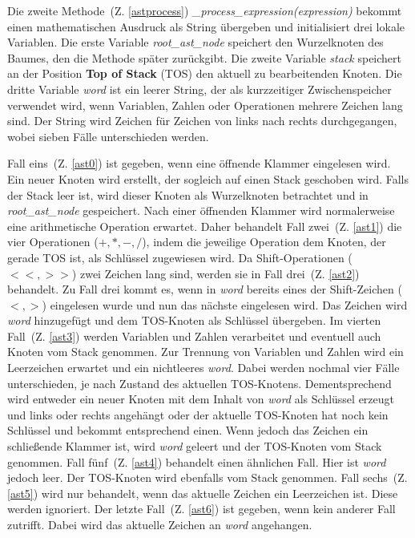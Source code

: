 Die zweite Methode~(Z. \ref{astprocess}) \textit{\_process\_expression(expression)} bekommt einen mathematischen Ausdruck als String übergeben und initialisiert drei lokale Variablen.
Die erste Variable \textit{root\_ast\_node} speichert den Wurzelknoten des Baumes, den die Methode später zurückgibt. Die zweite Variable \textit{stack} speichert an der 
Position \textbf{Top of Stack} (TOS) den aktuell zu bearbeitenden Knoten. Die dritte Variable \textit{word} ist ein leerer String, der als kurzzeitiger Zwischenspeicher verwendet wird,
wenn Variablen, Zahlen oder Operationen mehrere Zeichen lang sind.
Der String wird Zeichen für Zeichen von links nach rechts durchgegangen, wobei sieben Fälle unterschieden werden.

Fall eins~(Z. \ref{ast0}) ist gegeben, wenn eine öffnende Klammer eingelesen wird. Ein neuer Knoten wird erstellt, der sogleich auf einen Stack geschoben wird. Falls der Stack leer ist, wird
dieser Knoten als Wurzelknoten betrachtet und in \textit{root\_ast\_node} gespeichert.
Nach einer öffnenden Klammer wird normalerweise eine arithmetische Operation erwartet. 
Daher behandelt Fall zwei~(Z. \ref{ast1}) die vier Operationen ($+, *, -, /$), indem die jeweilige Operation dem Knoten, der gerade TOS ist,
als Schlüssel zugewiesen wird. Da Shift-Operationen ($<<, >>$) zwei Zeichen lang sind, werden sie in Fall drei~(Z. \ref{ast2}) behandelt.
Zu Fall drei kommt es, wenn in \textit{word} bereits eines der Shift-Zeichen ($<, >$) eingelesen wurde und nun das nächste eingelesen wird.
Das Zeichen wird \textit{word} hinzugefügt und dem TOS-Knoten als Schlüssel übergeben.
Im vierten Fall~(Z. \ref{ast3}) werden Variablen und Zahlen verarbeitet und eventuell auch Knoten vom Stack genommen.
Zur Trennung von Variablen und Zahlen wird ein Leerzeichen erwartet und ein nichtleeres \textit{word}.
Dabei werden nochmal vier Fälle unterschieden, je nach Zustand des aktuellen TOS-Knotens. Dementsprechend wird entweder ein neuer Knoten mit dem Inhalt von \textit{word} als Schlüssel
erzeugt und links oder rechts angehängt oder der aktuelle TOS-Knoten hat noch kein Schlüssel und bekommt entsprechend einen. 
Wenn jedoch das Zeichen ein schließende Klammer ist, wird \textit{word} geleert und der TOS-Knoten vom Stack genommen.
Fall fünf~(Z. \ref{ast4}) behandelt einen ähnlichen Fall. Hier ist \textit{word} jedoch leer. Der TOS-Knoten wird ebenfalls vom Stack genommen.
Fall sechs~(Z. \ref{ast5}) wird nur behandelt, wenn das aktuelle Zeichen ein Leerzeichen ist. Diese werden ignoriert.
Der letzte Fall~(Z. \ref{ast6}) ist gegeben, wenn kein anderer Fall zutrifft. Dabei wird das aktuelle Zeichen an \textit{word} angehangen.

